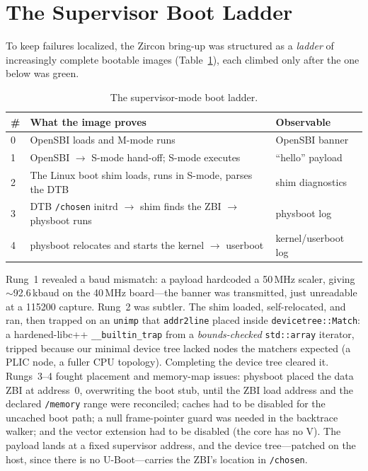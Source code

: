 \documentclass[conference,nofonttune]{IEEEtran}
\newcommand{\code}[1]{\texttt{#1}}
\begin{document}
\section{The Supervisor Boot Ladder}
\label{sec:ladder}

To keep failures localized, the Zircon bring-up was structured as a
\emph{ladder} of increasingly complete bootable images (Table~\ref{tab:ladder}),
each climbed only after the one below was green.

\begin{table}[t]
\caption{The supervisor-mode boot ladder.}
\label{tab:ladder}
\centering
\footnotesize
\begin{tabular}{@{}p{}p{}p{}@{}}
\toprule
\# & What the image proves & Observable \\
\midrule
0 & OpenSBI loads and M-mode runs & OpenSBI banner \\
1 & OpenSBI $\rightarrow$ S-mode hand-off; S-mode executes & ``hello'' payload \\
2 & The Linux boot shim loads, runs in S-mode, parses the DTB & shim diagnostics \\
3 & DTB \code{/chosen} initrd $\rightarrow$ shim finds the ZBI $\rightarrow$ physboot runs & physboot log \\
4 & physboot relocates and starts the kernel $\rightarrow$ userboot & kernel/userboot log \\
\bottomrule
\end{tabular}
\end{table}

Rung~1 revealed a baud mismatch: a payload hardcoded a 50\,MHz scaler, giving
$\sim$92.6\,kbaud on the 40\,MHz board---the banner was transmitted, just
unreadable at a 115200 capture. Rung~2 was subtler. The shim loaded,
self-relocated, and ran, then trapped on an \code{unimp} that
\code{addr2line} placed inside \code{devicetree::Match}: a hardened-libc++
\code{\_\_builtin\_trap} from a \emph{bounds-checked} \code{std::array} iterator,
tripped because our minimal device tree lacked nodes the matchers expected
(a PLIC node, a fuller CPU topology). Completing the device tree cleared it.
Rungs~3--4 fought placement and memory-map issues: physboot placed the data ZBI
at address~0, overwriting the boot stub, until the ZBI load address and the
declared \code{/memory} range were reconciled; caches had to be disabled for the
uncached boot path; a null frame-pointer guard was needed in the backtrace
walker; and the vector extension had to be disabled (the core has no V). The
payload lands at a fixed supervisor address, and the device tree---patched on the
host, since there is no U-Boot---carries the ZBI's location in \code{/chosen}.
\end{document}
